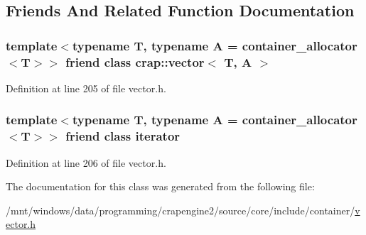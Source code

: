 \subsection{Friends And Related Function Documentation}
\hypertarget{classcrap_1_1vector_1_1const__iterator_ad6b7070de08891c8bdaba9bce10c2220}{
\subsubsection[{crap\+::vector$<$ T, A $>$}]{\setlength{\rightskip}{0pt plus 5cm}template$<$typename T, typename A = container\+\_\+allocator$<$\+T$>$$>$ friend class {\bf crap\+::vector}$<$ T, A $>$\hspace{0.3cm}{\ttfamily [friend]}}}\label{classcrap_1_1vector_1_1const__iterator_ad6b7070de08891c8bdaba9bce10c2220}


Definition at line 205 of file vector.\+h.

\hypertarget{classcrap_1_1vector_1_1const__iterator_a67171474c4da6cc8efe0c7fafefd2b2d}{
\subsubsection[{iterator}]{\setlength{\rightskip}{0pt plus 5cm}template$<$typename T, typename A = container\+\_\+allocator$<$\+T$>$$>$ friend class {\bf iterator}\hspace{0.3cm}{\ttfamily [friend]}}}\label{classcrap_1_1vector_1_1const__iterator_a67171474c4da6cc8efe0c7fafefd2b2d}


Definition at line 206 of file vector.\+h.



The documentation for this class was generated from the following file\+:\begin{DoxyCompactItemize}
\item 
/mnt/windows/data/programming/crapengine2/source/core/include/container/\hyperlink{vector_8h}{vector.\+h}\end{DoxyCompactItemize}
